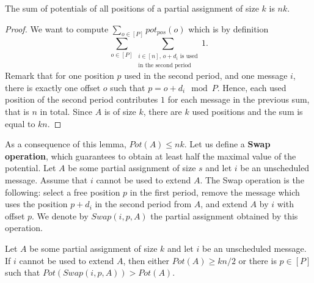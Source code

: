 \documentclass[a4paper,UKenglish,cleveref, autoref, thm-restate]{lipics-v2019}
\begin{document}
\begin{lemma}\label{lemma:inv}
The sum of potentials of all positions of a partial assignment of size $k$ is $nk$.  
\end{lemma}
\begin{proof}
We want to compute $\sum_{o \in [P]} pot_{pos}(o)$ which is by definition
$$\sum_{o \in [P]} \sum_{\substack {i \in [n],\, o + d_i \text{ is used} \\ \text{in the second period}}} 1.$$
Remark that for one position $p$ used in the second period, and one message $i$, there is exactly one offset $o$ such that $p = o+d_i \mod P$.
Hence, each used position of the second period contributes $1$ for each message in the previous sum, that is $n$ in total.
Since $A$ is of size $k$, there are $k$ used positions and the sum is equal to $kn$.
\end{proof}

 As a consequence of this lemma, $Pot(A) \leq nk$. Let us define a \textbf{Swap operation},
 which guarantees to obtain at least half the maximal value of the potential.
Let $A$ be some partial assignment of size $s$ and let $i$ be an unscheduled message. 
Assume that $i$ cannot be used to extend $A$. The Swap operation is the following: 
select a free position $p$ in the first period, remove the message which uses the position $p+d_i$ in the second period from $A$, and extend $A$ by $i$ with offset $p$. We denote by $Swap(i,p,A)$ the partial assignment obtained by this operation.

\begin{lemma}\label{lemma:swap}
Let $A$ be some partial assignment of size $k$ and let $i$ be an unscheduled message. If $i$ cannot be used to extend $A$, then either $Pot(A) \geq kn/2$ or there is $p \in [P]$ such that $Pot(Swap(i,p,A)) > Pot(A)$.
\end{lemma}
\end{document}
